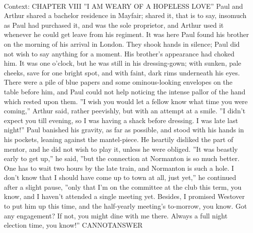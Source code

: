\documentclass[11pt,a4paper, onecolumn]{article}
\begin{document}
\\ Context: CHAPTER VIII ''I AM WEARY OF A HOPELESS LOVE'' Paul and Arthur shared a bachelor residence in Mayfair; shared it, that is to say, insomuch as Paul had purchased it, and was the sole proprietor, and Arthur used it whenever he could get leave from his regiment. It was here Paul found his brother on the morning of his arrival in London. They shook hands in silence; Paul did not wish to say anything for a moment. His brother's appearance had choked him. It was one o'clock, but he was still in his dressing-gown; with sunken, pale cheeks, save for one bright spot, and with faint, dark rims underneath his eyes. There were a pile of blue papers and some ominous-looking envelopes on the table before him, and Paul could not help noticing the intense pallor of the hand which rested upon them. ''I wish you would let a fellow know what time you were coming,'' Arthur said, rather peevishly, but with an attempt at a smile. ''I didn't expect you till evening, so I was having a shack before dressing. I was late last night!'' Paul banished his gravity, as far as possible, and stood with his hands in his pockets, leaning against the mantel-piece. He heartily disliked the part of mentor, and he did not wish to play it, unless he were obliged. ''It was beastly early to get up,'' he said, ''but the connection at Normanton is so much better. One has to wait two hours by the late train, and Normanton is such a hole. I don't know that I should have come up to town at all, just yet,'' he continued after a slight pause, ''only that I'm on the committee at the club this term, you know, and I haven't attended a single meeting yet. Besides, I promised Westover to put him up this time, and the half-yearly meeting's to-morrow, you know. Got any engagement? If not, you might dine with me there. Always a full night election time, you know!'' CANNOTANSWER
\end{document}
